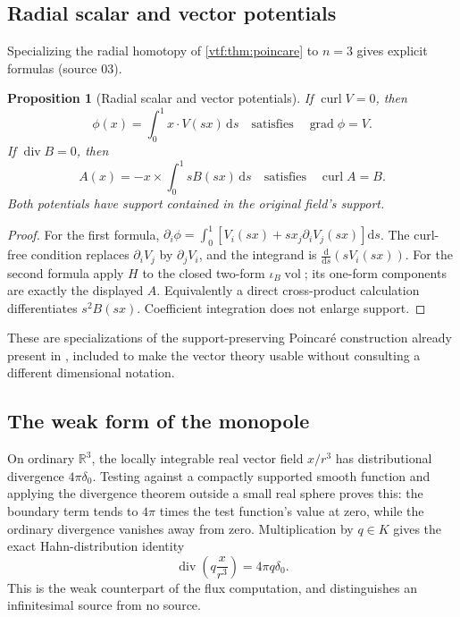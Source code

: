 \documentclass[11pt,letterpaper]{article}
\newtheorem{proposition}[theorem]{Proposition}
\theoremstyle{definition}
\theoremstyle{remark}
\newcommand{\R}{\mathbb R}\newcommand{\C}{\mathbb C}
\newcommand{\grad}{\operatorname{grad}}\newcommand{\Div}{\operatorname{div}}
\newcommand{\curl}{\operatorname{curl}}
\newcommand{\vol}{\operatorname{vol}}\newcommand{\GL}{\operatorname{GL}}
\newcommand{\dd}{\mathrm d}
\begin{document}
\subsection{Radial scalar and vector potentials}

Specializing the radial homotopy of \cref{vtf:thm:poincare} to $n=3$ gives
explicit formulas (source 03).

\begin{proposition}[Radial scalar and vector potentials]\label{vtf:3d:prop:potentials}
If $\curl V=0$, then
\[
 \phi(x)=\int_0^1x\cdot V(sx)\,\dd s
 \quad\text{satisfies}\quad \grad\phi=V.
\]
If $\Div B=0$, then
\[
 A(x)=-x\times\int_0^1sB(sx)\,\dd s
 \quad\text{satisfies}\quad\curl A=B.
\]
Both potentials have support contained in the original field's support.
\end{proposition}
\begin{proof}
For the first formula,
$\partial_i\phi=\int_0^1[V_i(sx)+s x_j\partial_iV_j(sx)]\dd s$.
The curl-free condition replaces $\partial_iV_j$ by $\partial_jV_i$, and the integrand is $\frac{\dd}{\dd s}(sV_i(sx))$. For the second formula apply $H$ to the closed two-form $\iota_B\vol$; its one-form components are exactly the displayed $A$. Equivalently a direct cross-product calculation differentiates $s^2B(sx)$. Coefficient integration does not enlarge support.
\end{proof}
These are specializations of the support-preserving Poincar\'e construction already present in \cite{RepoContours}, included to make the vector theory usable without consulting a different dimensional notation.

\subsection{The weak form of the monopole}\label{vtf:3d:subsec:weak}

On ordinary $\R^3$, the locally integrable real vector field $x/r^3$ has distributional divergence $4\pi\delta_0$. Testing against a compactly supported smooth function and applying the divergence theorem outside a small real sphere proves this: the boundary term tends to $4\pi$ times the test function's value at zero, while the ordinary divergence vanishes away from zero. Multiplication by $q\in K$ gives the exact Hahn-distribution identity
\[
 \Div\left(q\frac{x}{r^3}\right)=4\pi q\delta_0.
\]
This is the weak counterpart of the flux computation, and distinguishes an infinitesimal source from no source.
\end{document}
